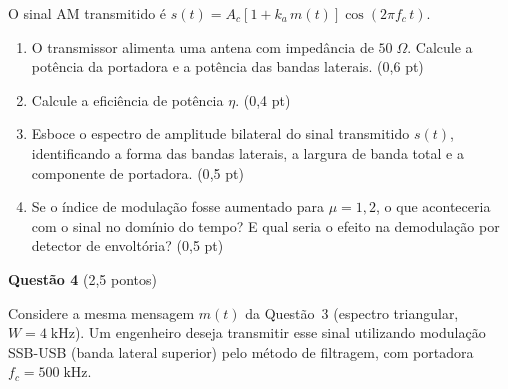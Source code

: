 \documentclass[11pt,a4paper]{article}
\begin{document}
\begin{center}
\end{center}

O sinal AM transmitido é $s(t) = A_c[1 + k_a\,m(t)]\cos(2\pi f_c\,t)$.

\begin{enumerate}[label=\alph*)]
  \item O transmissor alimenta uma antena com impedância de $50\;\Omega$. Calcule a potência da portadora e a potência das bandas laterais. \hfill (0{,}6 pt)
  \item Calcule a eficiência de potência $\eta$. \hfill (0{,}4 pt)
  \item Esboce o espectro de amplitude bilateral do sinal transmitido $s(t)$, identificando a forma das bandas laterais, a largura de banda total e a componente de portadora. \hfill (0{,}5 pt)
  \item Se o índice de modulação fosse aumentado para $\mu = 1{,}2$, o que aconteceria com o sinal no domínio do tempo? E qual seria o efeito na demodulação por detector de envoltória? \hfill (0{,}5 pt)
\end{enumerate}

\textbf{Questão 4} \hfill (2{,}5 pontos)

Considere a mesma mensagem $m(t)$ da Questão~3 (espectro triangular, $W = 4\;\text{kHz}$). Um engenheiro deseja transmitir esse sinal utilizando modulação SSB-USB (banda lateral superior) pelo método de filtragem, com portadora $f_c = 500\;\text{kHz}$.
\end{document}
